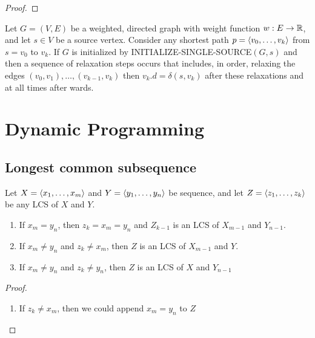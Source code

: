 \documentclass[11pt]{article}
\begin{document}
\begin{proof}

\end{proof}

\begin{lemma}
Let \(G=(V,E)\) be a weighted, directed graph with weight function \(w:E\to\mathbb{R}\), and let \(s\in V\)
be a source vertex. Consider any shortest path \(p=\langle v_0,\dots,v_k\rangle\) from \(s=v_0\) to \(v_k\).
If \(G\) is initialized by INITIALIZE-SINGLE-SOURCE\((G,s)\) and then a sequence of relaxation
steps occurs that includes, in order, relaxing the edges \((v_0,v_1),\dots,(v_{k-1},v_k)\)
then \(v_k.d=\delta(s,v_k)\) after these relaxations and at all times after wards.
\end{lemma}
\section{Dynamic Programming}
\label{sec:orgc46dd7c}
\subsection{Longest common subsequence}
\label{sec:orgbcb879e}
\begin{theorem}
Let \(X=\langle x_1,\dots,x_m\rangle\) and \(Y=\langle y_1,\dots,y_n\rangle\) be sequence, and let \(Z=\langle z_1,\dots,z_k\rangle\) be any LCS
of \(X\) and \(Y\).
\begin{enumerate}
\item If \(x_m=y_n\), then \(z_k=x_m=y_n\) and \(Z_{k-1}\) is an LCS of \(X_{m-1}\)
and \(Y_{n-1}\).
\item If \(x_m\neq y_n\) and \(z_k\neq x_m\), then \(Z\) is an LCS of \(X_{m-1}\) and \(Y\).
\item If \(x_m\neq y_n\) and \(z_k\neq y_n\), then \(Z\) is an LCS of \(X\) and \(Y_{n-1}\)
\end{enumerate}
\end{theorem}

\begin{proof}
\begin{enumerate}
\item If \(z_k\neq x_m\), then we could append \(x_m=y_n\) to \(Z\)
\end{enumerate}
\end{proof}
\end{document}
